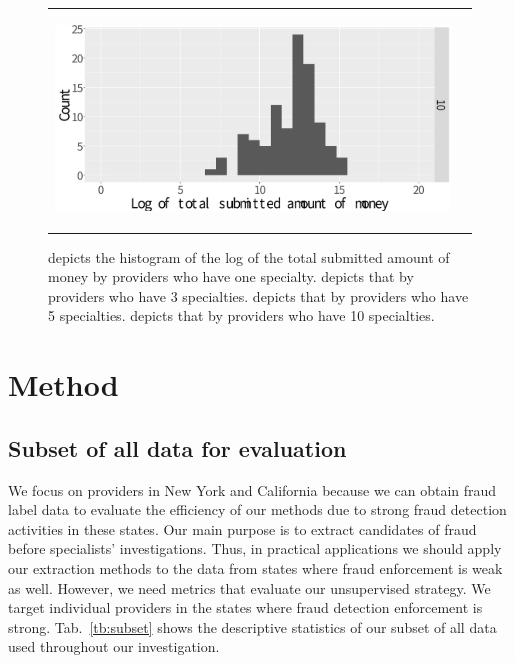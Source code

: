 \documentclass[dvipdfmx, english]{ampmt}             %
\newcommand{\Tabref}[1]{Tab.~\ref{#1}}
\begin{document}
\begin{figure}[ht]
\begin{tabular}{cc}
\begin{minipage}{.5\hsize}
	\subcaption{}\label{fig:5}
      \end{minipage} 
       \begin{minipage}{.5\hsize}
        \centering
        \centerline{\includegraphics[scale=0.22]{../img/spc-type-variance/10.pdf}}
	\subcaption{}\label{fig:10}
      \end{minipage} \\
    \end{tabular}
    
    
     \caption{ depicts the histogram of the log of the total submitted amount of money by providers who have one specialty.  depicts that by providers who have 3 specialties.  depicts that by providers who have 5 specialties.  depicts that by providers who have 10 specialties.}
      \label{fig:num-spc-vari}
\end{figure}



\section{Method}\label{sec:method}
\subsection{Subset of all data for evaluation}
We focus on providers in New York and California because we can obtain fraud label data to evaluate the efficiency of our methods due to strong fraud detection activities in these states.
Our main purpose is to extract candidates of fraud before specialists' investigations. Thus, in practical applications we should apply our extraction methods to the data from states where fraud enforcement is weak as well. However, we need metrics that evaluate our unsupervised strategy. We target individual providers in the states where fraud detection enforcement is strong. \Tabref{tb:subset} shows the descriptive statistics of our subset of all data used throughout our investigation.
\end{document}
